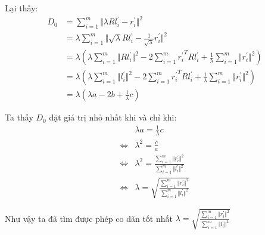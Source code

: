\documentclass[../../main.tex]{subfiles}
\begin{document}
Lại thấy:
\begin{equation}
    \begin{split}
        D_0 &= \sum_{i = 1}^{m} \Vert \lambda R l^{\prime}_i - r^{\prime}_i \Vert ^2 \\
        &= \lambda \sum_{i = 1}^{m} \Vert \sqrt{\lambda} R l^{\prime}_i - \frac{1}{\sqrt{\lambda}}r^{\prime}_i \Vert ^2 \\
        &= \lambda (\lambda \sum_{i = 1}^{m} \Vert R l^{\prime}_i  \Vert ^2 - 2\sum_{i = 1}^{m}{r^{\prime}_i}^T R l^{\prime}_i + \frac{1}{\lambda} \sum_{i = 1}^{m}\Vert r^{\prime}_i \Vert^2)\\
        &= \lambda (\lambda \sum_{i = 1}^{m} \Vert l^{\prime}_i  \Vert ^2 - 2\sum_{i = 1}^{m}{r^{\prime}_i}^T R l^{\prime}_i + \frac{1}{\lambda} \sum_{i = 1}^{m}\Vert r^{\prime}_i \Vert^2)\\
        &= \lambda (\lambda a - 2b + \frac{1}{\lambda}c)
    \end{split}
\end{equation}

Ta thấy $D_0$ đặt giá trị nhỏ nhất khi và chỉ khi:
\begin{equation}
    \begin{split}
    & \lambda a = \frac{1}{\lambda}c \\
    \Leftrightarrow & \lambda^2 = \frac{c}{a} \\
    \Leftrightarrow & \lambda^2 = \frac{\sum_{i = 1}^{m}\Vert r^{\prime}_i \Vert^2}{\sum_{i = 1}^{m} \Vert l^{\prime}_i  \Vert ^2}\\
    \Leftrightarrow & \lambda = \sqrt{\frac{\sum_{i = 1}^{m}\Vert r^{\prime}_i \Vert^2}{\sum_{i = 1}^{m} \Vert l^{\prime}_i  \Vert ^2}}
    \end{split}
\end{equation}

Như vậy ta đã tìm được phép co dãn tốt nhất $ \lambda = \sqrt{\frac{\sum_{i = 1}^{m}\Vert r^{\prime}_i \Vert^2}{\sum_{i = 1}^{m} \Vert l^{\prime}_i  \Vert ^2}}$
\end{document}
